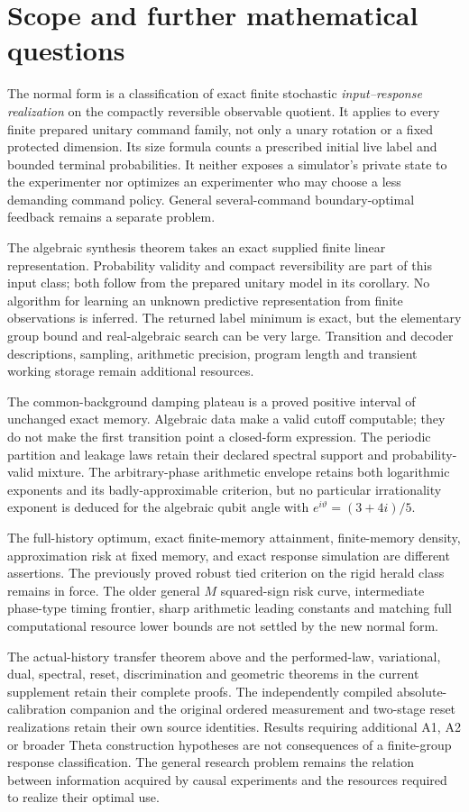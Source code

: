 \section{Scope and further mathematical questions}\label{sec:r73-scope}
The normal form is a classification of exact finite stochastic
\emph{input--response realization} on the compactly reversible observable
quotient. It applies to every finite prepared unitary command family, not
only a unary rotation or a fixed protected dimension. Its size formula
counts a prescribed initial live label and bounded terminal probabilities.
It neither exposes a simulator's private state to the experimenter nor
optimizes an experimenter who may choose a less demanding command policy.
General several-command boundary-optimal feedback remains a separate
problem.

The algebraic synthesis theorem takes an exact supplied finite linear
representation. Probability validity and compact reversibility are part
of this input class; both follow from the prepared unitary model in its
corollary. No algorithm for learning an unknown predictive representation
from finite observations is inferred. The returned label minimum is
exact, but the elementary group bound and real-algebraic search can be
very large. Transition and decoder descriptions, sampling, arithmetic
precision, program length and transient working storage remain additional
resources.

The common-background damping plateau is a proved positive interval of
unchanged exact memory. Algebraic data make a valid cutoff computable;
they do not make the first transition point a closed-form expression.
The periodic partition and leakage laws retain their declared spectral
support and probability-valid mixture. The arbitrary-phase arithmetic
envelope retains both logarithmic exponents and its badly-approximable
criterion, but no particular irrationality exponent is deduced for the
algebraic qubit angle with $e^{i\vartheta}=(3+4i)/5$.

The full-history optimum, exact finite-memory attainment, finite-memory
density, approximation risk at fixed memory, and exact response
simulation are different assertions. The previously proved robust tied
criterion on the rigid herald class remains in force. The older general
$M$ squared-sign risk curve, intermediate phase-type timing frontier,
sharp arithmetic leading constants and matching full computational
resource lower bounds are not settled by the new normal form.

The actual-history transfer theorem above and the performed-law,
variational, dual, spectral, reset, discrimination and geometric theorems
in the current supplement retain their complete proofs. The independently
compiled absolute-calibration companion and the original ordered
measurement and two-stage reset realizations retain their own source
identities. Results requiring additional A1, A2 or broader Theta
construction hypotheses are not consequences of a finite-group response
classification. The general research problem remains the relation
between information acquired by causal experiments and the resources
required to realize their optimal use.


